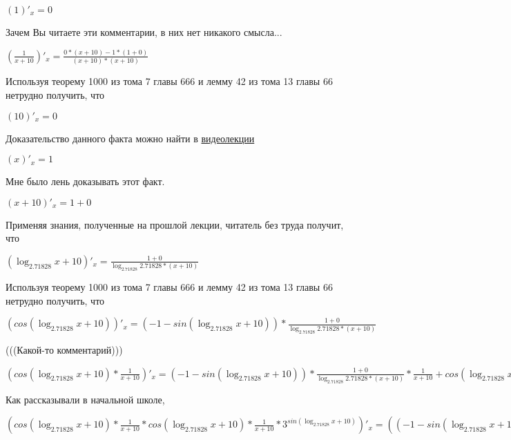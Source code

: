 \documentclass[12pt,a4paper,fleqn]{article}
\theoremstyle{definition}
\begin{document}
$( 1 )'_{x} =  0 $

Зачем Вы читаете эти комментарии, в них нет никакого смысла... 

$(\frac{ 1 }{ x  +  10 }
)'_{x} = \frac{ 0  * ( x  +  10 ) -  1  * ( 1  +  0 )}{( x  +  10 ) * ( x  +  10 )}
$

Используя теорему 1000 из тома 7 главы 666 и лемму 42 из тома 13 главы 66 нетрудно получить, что 

$( 10 )'_{x} =  0 $

Доказательство данного факта можно найти в \href{https://www.youtube.com/watch?v=dQw4w9WgXcQ}{видеолекции} 

$( x )'_{x} =  1 $

Мне было лень доказывать этот факт.

$( x  +  10 )'_{x} =  1  +  0 $

Применяя знания, полученные на прошлой лекции, читатель без труда получит, что 

$(\log_{ 2.71828 }{ x  +  10 })'_{x} = \frac{ 1  +  0 }{\log_{ 2.71828 }{ 2.71828 } * ( x  +  10 )}
$

Используя теорему 1000 из тома 7 главы 666 и лемму 42 из тома 13 главы 66 нетрудно получить, что 

$(cos(\log_{ 2.71828 }{ x  +  10 }))'_{x} = ( -1  - sin(\log_{ 2.71828 }{ x  +  10 })) * \frac{ 1  +  0 }{\log_{ 2.71828 }{ 2.71828 } * ( x  +  10 )}
$

(((Какой-то комментарий))) 

$(cos(\log_{ 2.71828 }{ x  +  10 }) * \frac{ 1 }{ x  +  10 }
)'_{x} = ( -1  - sin(\log_{ 2.71828 }{ x  +  10 })) * \frac{ 1  +  0 }{\log_{ 2.71828 }{ 2.71828 } * ( x  +  10 )}
 * \frac{ 1 }{ x  +  10 }
 + cos(\log_{ 2.71828 }{ x  +  10 }) * \frac{ 0  * ( x  +  10 ) -  1  * ( 1  +  0 )}{( x  +  10 ) * ( x  +  10 )}
$

Как рассказывали в начальной школе, 

$(cos(\log_{ 2.71828 }{ x  +  10 }) * \frac{ 1 }{ x  +  10 }
 * cos(\log_{ 2.71828 }{ x  +  10 }) * \frac{ 1 }{ x  +  10 }
 * { 3 }^{sin(\log_{ 2.71828 }{ x  +  10 })})'_{x} = (( -1  - sin(\log_{ 2.71828 }{ x  +  10 })) * \frac{ 1  +  0 }{\log_{ 2.71828 }{ 2.71828 } * ( x  +  10 )}
 * \frac{ 1 }{ x  +  10 }
 + cos(\log_{ 2.71828 }{ x  +  10 }) * \frac{ 0  * ( x  +  10 ) -  1  * ( 1  +  0 )}{( x  +  10 ) * ( x  +  10 )}
) * cos(\log_{ 2.71828 }{ x  +  10 }) * \frac{ 1 }{ x  +  10 }
 * { 3 }^{sin(\log_{ 2.71828 }{ x  +  10 })} + cos(\log_{ 2.71828 }{ x  +  10 }) * \frac{ 1 }{ x  +  10 }
 * ((( -1  - sin(\log_{ 2.71828 }{ x  +  10 })) * \frac{ 1  +  0 }{\log_{ 2.71828 }{ 2.71828 } * ( x  +  10 )}
 * \frac{ 1 }{ x  +  10 }
 + cos(\log_{ 2.71828 }{ x  +  10 }) * \frac{ 0  * ( x  +  10 ) -  1  * ( 1  +  0 )}{( x  +  10 ) * ( x  +  10 )}
) * { 3 }^{sin(\log_{ 2.71828 }{ x  +  10 })} + cos(\log_{ 2.71828 }{ x  +  10 }) * \frac{ 1 }{ x  +  10 }
 * \log_{ 2.71828 }{ 3 } * cos(\log_{ 2.71828 }{ x  +  10 }) * \frac{ 1  +  0 }{\log_{ 2.71828 }{ 2.71828 } * ( x  +  10 )}
 * { 3 }^{sin(\log_{ 2.71828 }{ x  +  10 })})$
\end{document}
